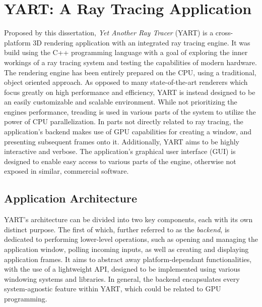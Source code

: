 
\chapter{YART: A Ray Tracing Application} \label{ch:Application}

Proposed by this dissertation, \textit{Yet Another Ray Tracer} (YART) is a cross-platform 3D rendering application with an integrated ray tracing engine. 
It was build using the C++ programming language with a goal of exploring the inner workings of a ray tracing system and testing the capabilities of modern hardware.
The rendering engine has been entirely prepared on the CPU, using a traditional, object oriented approach.
As opposed to many state-of-the-art renderers which focus greatly on high performance and efficiency, YART is instead designed to be an easily customizable and scalable environment. 
While not prioritizing the engines performance, treading is used in various parts of the system to utilize the power of CPU parallelization.
In parts not directly related to ray tracing, the application's backend makes use of GPU capabilities for creating a window, and presenting subsequent frames onto it.
Additionally, YART aims to be highly interactive and verbose.
The application's graphical user interface (GUI) is designed to enable easy access to various parts of the engine, otherwise not exposed in similar, commercial software. 

\section{Application Architecture}

YART's architecture can be divided into two key components, each with its own distinct purpose.
The first of which, further referred to as the \textit{backend}, is dedicated to performing lower-level operations, such as opening and managing the application window, polling incoming inputs, as well as creating and displaying application frames. 
It aims to abstract away platform-dependant functionalities, with the use of a lightweight API, designed to be implemented using various windowing systems and libraries. 
In general, the backend encapsulates every system-agnostic feature within YART, which could be related to GPU programming.

